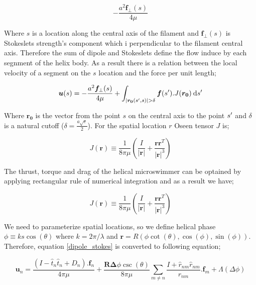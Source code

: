 \documentclass[12pt,a4paper,titlepage]{report}
\begin{document}
  

\begin{equation}
-\frac{a^2 \bm{f}_\perp (s)}{4\mu}
\label{dipole}
\end{equation}






Where $s$ is a location along the central axis of the filament and $\bm{f}_\perp (s)$ is Stokeslets strength\rq{}s
component which i perpendicular to the filament central axis. Therefore the sum of dipole and Stokeslets
define the flow induce by each segnment of the helix body. As a result there is a relation between 
the local velocity of a segment on the $s$ location and the force per unit length;




\begin{equation}
 \bm{u}(s) = -\frac{a^2 \bm{f}_\perp (s)}{4\mu} + \int_{|\bm{r_0}(s\rq{},s)| > \delta } \bm{f}(s\rq{}).J(\bm{r_0})\: \mathrm{d}s\rq{}
\label{dipole_stokes}
\end{equation}



Where $\bm{r_0}$ is the vector from the point $s$ on the central axis to the point $s\rq{}$ and $\delta$ is
 a natural cutoff ($\delta = \frac{a\sqrt{e}}{2}$). For the spatial location $r$ Oseen tensor $J$ is;

 
\begin{equation}
 J(\bm{r}) \equiv \frac{1}{8\pi \mu} (\frac{I}{|\bm{r}|} + \frac{\bm{rr}^T}{|\bm{r}|^3})
\label{Oseen}
\end{equation}

The thrust, torque and drag of the helical microswimmer can be optained by applying rectangular rule of
numerical integration and as a result we have;


\begin{equation}
 J(\bm{r}) \equiv \frac{1}{8\pi \mu} (\frac{I}{|\bm{r}|} + \frac{\bm{rr}^T}{|\bm{r}|^3})
\label{Oseen}
\end{equation}

We need to parameterize spatial locations, so we define helical phase $\phi \equiv ks \cos(\theta)$ where 
$k = 2 \pi / \lambda$ and $\bm{r} = R(\phi \cot(\theta), \cos(\phi) , \sin(\phi))$. Therefore, equation \ref{dipole_stokes}
is converted to following equation;




\begin{equation}
\bm{u}_n = \frac{(I- \hat{t}_n\hat{t}_n + D_n). \bm{f}_n}{4\pi \mu}
+ \frac{\bm{R}\bm{\Delta}\phi \csc (\theta)}{8 \pi \mu} \sum_{m \neq n}  \frac{I+\hat{r}_{nm} \hat{r}_{nm}}{r_{nm}}. \bm{f}_m
+ \Lambda (\Delta \phi)
\label{numerical}
\end{equation}
\end{document}
